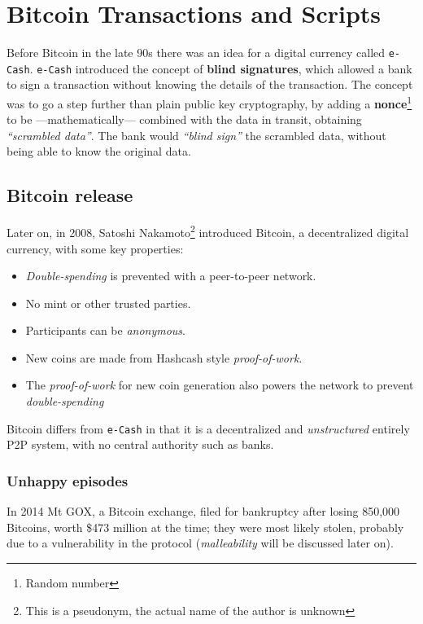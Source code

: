 \chapter{Bitcoin Transactions and Scripts}

Before Bitcoin in the late 90s there was an idea for a digital currency called \texttt{e-Cash}.
\texttt{e-Cash} introduced the concept of \textbf{blind signatures}, which allowed a bank to sign a transaction without knowing the details of the transaction.
The concept was to go a step further than plain public key cryptography, by adding a \textbf{nonce}\footnote{Random number} to be ---mathematically--- combined with the data in transit, obtaining \textit{``scrambled data''}.
The bank would \textit{``blind sign''} the scrambled data, without being able to know the original data.

\section{Bitcoin release}

{Later on, in 2008, Satoshi Nakamoto\footnote{This is a pseudonym, the actual name of the author is unknown} introduced Bitcoin, a decentralized digital currency, with some key properties:\ns
\begin{itemize}
   \item \textit{Double-spending} is prevented with a peer-to-peer network.
   \item No mint or other trusted parties.
   \item Participants can be \textit{anonymous}.
   \item New coins are made from Hashcash style \textit{proof-of-work}.
   \item The \textit{proof-of-work} for new coin generation also powers the network to prevent \textit{double-spending}
\end{itemize}}

Bitcoin differs from \texttt{e-Cash} in that it is a decentralized and \textit{unstructured} entirely P2P system, with no central authority such as banks.

\subsection{Unhappy episodes}
In 2014 Mt GOX, a Bitcoin exchange, filed for bankruptcy after losing 850,000 Bitcoins, worth \$473 million at the time; they were most likely stolen, probably due to a vulnerability in the protocol (\textit{malleability} will be discussed later on).

